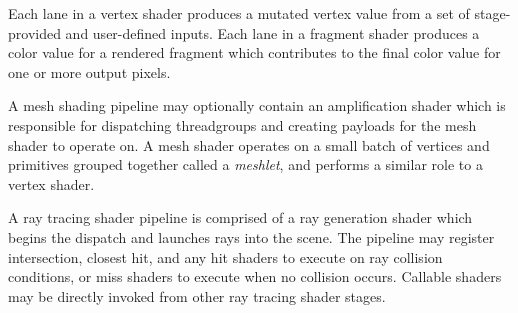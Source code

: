 \p Each \gls{lane} in a vertex shader produces a mutated vertex value from a set
of stage-provided and user-defined inputs. Each \gls{lane} in a fragment shader
produces a color value for a rendered fragment which contributes to the final
color value for one or more output pixels.



\p A mesh shading pipeline may optionally contain an amplification shader which
is responsible for dispatching \gls{threadgroup}s and creating payloads for the
mesh shader to operate on. A mesh shader operates on a small batch of vertices
and primitives grouped together called a \textit{meshlet}, and performs a
similar role to a vertex shader.



\p A ray tracing shader pipeline is comprised of a ray generation shader which
begins the dispatch and launches rays into the scene. The pipeline may register
intersection, closest hit, and any hit shaders to execute on ray collision
conditions, or miss shaders to execute when no collision occurs. Callable
shaders may be directly invoked from other ray tracing shader stages.

